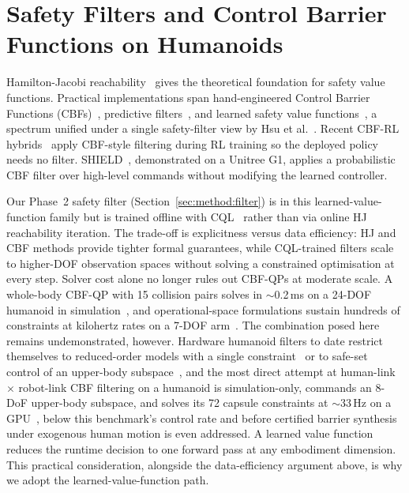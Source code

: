 \documentclass[11pt,a4paper]{report}
\begin{document}
\section{Safety Filters and Control Barrier Functions on Humanoids}
\label{sec:bg:cbf}

Hamilton-Jacobi reachability~\cite{bansal2017hamilton,ganai2024hjsurvey}
gives the theoretical foundation for safety value functions.
Practical implementations span hand-engineered Control Barrier
Functions (CBFs)~\cite{ames2019cbf}, predictive
filters~\cite{wabersich2023datadriven}, and learned safety value
functions~\cite{srinivasan2020learning,thananjeyan2021recovery}, a
spectrum unified under a single safety-filter view by Hsu et
al.~\cite{hsu2024safetyfilter}.
Recent CBF-RL hybrids~\cite{cbfrl2024} apply CBF-style filtering
during RL training so the deployed policy needs no filter.
SHIELD~\cite{shield2025}, demonstrated on a Unitree G1, applies a
probabilistic CBF filter over high-level commands without modifying
the learned controller.

Our Phase~2 safety filter (Section~\ref{sec:method:filter}) is in
this learned-value-function family but is trained offline with
\textsc{CQL}~\cite{kumar2020cql} rather than via online HJ
reachability iteration. The trade-off is explicitness versus
data efficiency: HJ and CBF methods provide tighter formal
guarantees, while \textsc{CQL}-trained filters scale to higher-DOF
observation spaces without solving a constrained optimisation at
every step. Solver cost alone no longer rules out CBF-QPs at
moderate scale. A whole-body CBF-QP with 15 collision pairs solves
in $\sim$0.2\,ms on a 24-DOF humanoid in
simulation~\cite{khazoom2022selfcollision}, and operational-space
formulations sustain hundreds of constraints at kilohertz rates on a
7-DOF arm~\cite{morton2025oscbf}. The combination posed here remains
undemonstrated, however. Hardware humanoid filters to date restrict
themselves to reduced-order models with a single
constraint~\cite{bena2025poisson,shield2025} or to safe-set control
of an upper-body subspace~\cite{sun2025spark}, and the most direct
attempt at human-link $\times$ robot-link CBF filtering on a
humanoid is simulation-only, commands an 8-DoF upper-body subspace,
and solves its 72 capsule constraints at $\sim$33\,Hz on a
GPU~\cite{cai2026humanoidcbf}, below this benchmark's control rate
and before certified barrier synthesis under exogenous human motion
is even addressed. A learned value function reduces the runtime
decision to one forward pass at any embodiment dimension. This
practical consideration, alongside the data-efficiency argument
above, is why we adopt the learned-value-function path.
\end{document}
